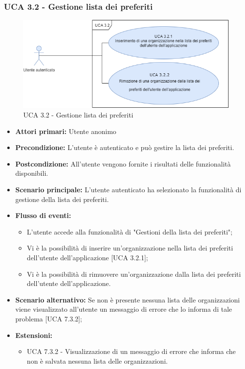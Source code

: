 \subsubsection{UCA 3.2 - Gestione lista dei preferiti}%
\begin{figure}[h]
	\centering
	
	\includegraphics[scale=0.5]{sezioni/UseCase/Immagini/UCA3.2.png}
	\caption{UCA 3.2 - Gestione lista dei preferiti}
\end{figure}
\begin{itemize}
	\item \textbf{Attori primari:} Utente anonimo
	\item \textbf{Precondizione:} L'utente è autenticato e può gestire la lista dei preferiti.
	\item \textbf{Postcondizione:} All'utente vengono fornite i risultati delle funzionalità disponibili.
	\item \textbf{Scenario principale:} L'utente autenticato ha selezionato la funzionalità di gestione della lista dei preferiti.
	\item \textbf{Flusso di eventi:}
			\begin{itemize}
			\item L'utente accede alla funzionalità di "Gestioni della lista dei preferiti";
			\item Vi è la possibilità di inserire un'organizzazione nella lista dei preferiti dell'utente dell'applicazione [UCA 3.2.1];
			\item Vi è la possibilità di rimuovere un'organizzazione dalla lista dei preferiti dell'utente dell'applicazione.
			\end{itemize}
	\item \textbf{Scenario alternativo:} Se non è presente nessuna lista delle organizzazioni viene visualizzato all'utente un messaggio di errore che lo informa di tale problema [UCA 7.3.2];
	\item \textbf{Estensioni:}
	\begin{itemize}
		\item UCA 7.3.2 - Visualizzazione di un messaggio di errore che informa che non è salvata nessuna lista delle organizzazioni.
	\end{itemize}
\end{itemize}

